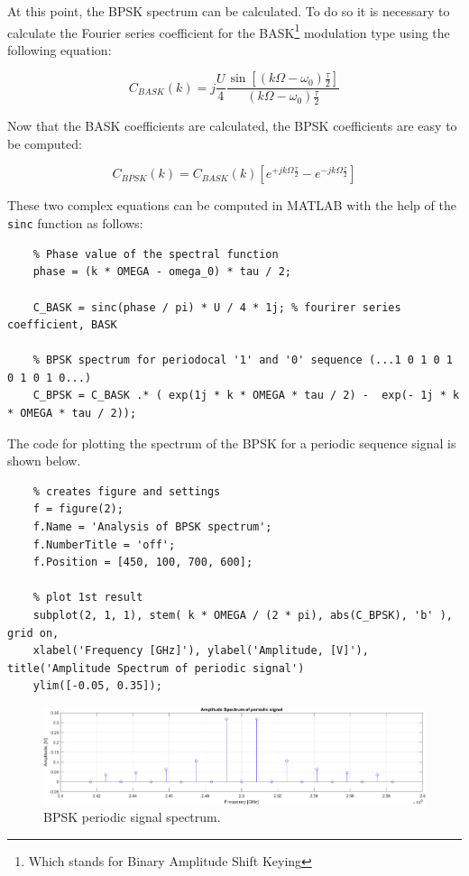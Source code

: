 \noindent At this point, the BPSK spectrum can be calculated. To do so it is necessary to calculate the Fourier series coefficient for the BASK\footnote{Which stands for Binary Amplitude Shift Keying} modulation type using the following equation:

\begin{equation*}
    C_{BASK}(k) = j\frac{U}{4} \frac{\sin\left[ \left( k\Omega - \omega_0 \right) \frac{\tau}{2}\right]}{\left( k\Omega - \omega_0 \right) \frac{\tau}{2}}
\end{equation*}

\noindent Now that the BASK coefficients are calculated, the BPSK coefficients are easy to be computed:

\begin{equation*}
    C_{BPSK}(k) = C_{BASK}(k) \left[ e^{+jk\Omega\frac{\tau}{2}} - e^{-jk\Omega\frac{\tau}{2}} \right]
\end{equation*}

\noindent These two complex equations can be computed in MATLAB with the help of the \texttt{sinc} function as follows:

\begin{lstlisting}
    % Phase value of the spectral function
    phase = (k * OMEGA - omega_0) * tau / 2;

    C_BASK = sinc(phase / pi) * U / 4 * 1j; % fourirer series coefficient, BASK

    % BPSK spectrum for periodocal '1' and '0' sequence (...1 0 1 0 1 0 1 0 1 0...)
    C_BPSK = C_BASK .* ( exp(1j * k * OMEGA * tau / 2) -  exp(- 1j * k * OMEGA * tau / 2));
\end{lstlisting}

\noindent The code for plotting the spectrum of the BPSK for a periodic sequence signal is shown below. 

\begin{lstlisting}
    % creates figure and settings
    f = figure(2);
    f.Name = 'Analysis of BPSK spectrum';
    f.NumberTitle = 'off';
    f.Position = [450, 100, 700, 600];
    
    % plot 1st result
    subplot(2, 1, 1), stem( k * OMEGA / (2 * pi), abs(C_BPSK), 'b' ), grid on,
    xlabel('Frequency [GHz]'), ylabel('Amplitude, [V]'), title('Amplitude Spectrum of periodic signal')
    ylim([-0.05, 0.35]);
\end{lstlisting}

\begin{figure}[h]
    \centering
    \includegraphics[width = \textwidth]{../res/imgs/periodic-signal-spectrum.png}
    \caption{BPSK periodic signal spectrum.}
    \label{fig:periodic-signal-spectrum}
\end{figure}


